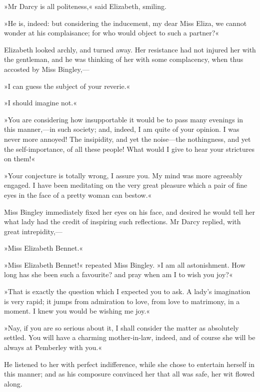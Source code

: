 »Mr Darcy is all politeness,« said Elizabeth, smiling.

»He is, indeed: but considering the inducement, my dear Miss Eliza, we cannot wonder at his complaisance; for who would object to such a partner?«

Elizabeth looked archly, and turned away. Her resistance had not injured her with the gentleman, and he was thinking of her with some complacency, when thus accosted by Miss Bingley,—

»I can guess the subject of your reverie.«

»I should imagine not.«

»You are considering how insupportable it would be to pass many evenings in this manner,—in such society; and, indeed, I am quite of your opinion. I was never more annoyed! The insipidity, and yet the noise—the nothingness, and yet the self-importance, of all these people! What would I give to hear your strictures on them!«

»Your conjecture is totally wrong, I assure you. My mind was more agreeably engaged. I have been meditating on the very great pleasure which a pair of fine eyes in the face of a pretty woman can bestow.«

Miss Bingley immediately fixed her eyes on his face, and desired he would tell her what lady had the credit of inspiring such reflections. Mr Darcy replied, with great intrepidity,—

»Miss Elizabeth Bennet.«

»Miss Elizabeth Bennet!« repeated Miss Bingley. »I am all astonishment. How long has she been such a favourite? and pray when am I to wish you joy?«

»That is exactly the question which I expected you to ask. A lady's imagination is very rapid; it jumps from admiration to love, from love to matrimony, in a moment. I knew you would be wishing me joy.«

»Nay, if you are so serious about it, I shall consider the matter as absolutely settled. You will have a charming mother-in-law, indeed, and of course she will be always at Pemberley with you.«

He listened to her with perfect indifference, while she chose to entertain herself in this manner; and as his composure convinced her that all was safe, her wit flowed along.